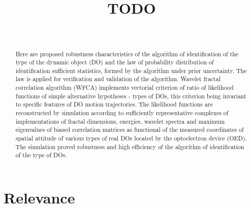 \documentclass[
11pt,%
tightenlines,%
twoside,%
onecolumn,%
nofloats,%
nobibnotes,%
nofootinbib,%
superscriptaddress,%
noshowpacs,%
centertags]%
{revtex4}
\begin{document}

\title{TODO}

\author{~}
 




\begin{abstract}
Here are proposed robustness characteristics of the algorithm of identification of the type of the dynamic object (DO) and the law of probability distribution of identification sufficient statistics, formed by the algorithm under prior uncertainty.
The law is applied for verification and validation of the algorithm.
Wavelet fractal correlation algorithm (WFCA) implements vectorial criterion of ratio of likelihood functions of simple alternative hypotheses - types of DOs, this criterion being invariant to specific features of DO motion trajectories.
The likelihood functions are reconstructed by simulation according to sufficiently representative complexes of implementations of fractal dimensions, energies, wavelet spectra and maximum eigenvalues of biased correlation matrices as functional of the measured coordinates of spatial attitude of various types of real DOs located by the optoelectron device (OED).
The simulation proved  robustness and high efficiency of the algorithm of identification of the type of DOs.
\end{abstract}



\maketitle


\section{Relevance}
\end{document}
